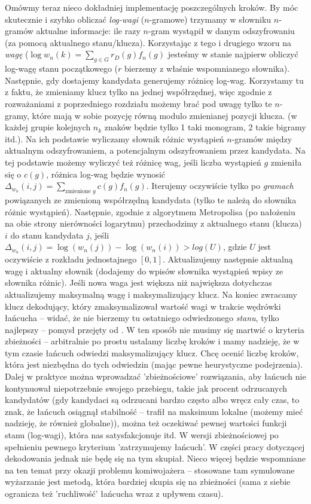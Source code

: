 \documentclass[a4paper]{article}
\theoremstyle{defn}
\theoremstyle{theorem}
\theoremstyle{lemma}
\theoremstyle{cor}
\theoremstyle{fact}
\begin{document}
Omówmy teraz nieco dokładniej implementację poszczególnych kroków. By móc skutecznie i szybko obliczać \textit{log-wagi} ($n$-gramowe) trzymamy w słowniku $n$-gramów aktualne informacje: ile razy $n$-gram wystąpił w danym odszyfrowaniu (za pomocą aktualnego stanu/klucza). Korzystając z tego i drugiego wzoru na \textit{wagę} ($\log w_n(k) =\sum\limits_{g \in G}  {r_D(g)} f_n(g)$ jesteśmy w stanie najpierw obliczyć log-wagę stanu początkowego ($r$ bierzemy z właśnie wspomnianego słownika). Następnie, gdy dostajemy kandydata generujemy różnicę log-wag. Korzystamy tu z faktu, że zmieniamy klucz tylko na jednej współrzędnej, więc zgodnie z rozważaniami z poprzedniego rozdziału możemy brać pod uwagę tylko te $n$-gramy, które mają w sobie pozycję równą modulo zmienianej pozycji klucza. (w każdej grupie kolejnych $n_k$ znaków będzie tylko 1 taki monogram, 2 takie bigramy itd.). Na ich podstawie wyliczamy słownik różnic wystąpień $n$-gramów między aktualnym odszyfrowaniem, a potencjalnym odszyfrowaniem przez kandydata. Na tej podstawie możemy wyliczyć też różnicę wag, jeśli liczba wystąpień $g$ zmieniła się o $c(g)$, różnica log-wag będzie wynosić $\Delta_{w_n}(i,j) = \sum\limits_{\text{zmienione } g}  {c(g)} f_n(g)$. Iterujemy oczywiście tylko po \textit{gramach} powiązanych ze zmienioną współrzędną kandydata (tylko te należą do słownika różnic wystąpień). Następnie, zgodnie z algorytmem Metropolisa (po nałożeniu na obie strony nierówności logarytmu) przechodzimy z aktualnego stanu (klucza) $i$ do stanu kandydata $j$, jeśli $\Delta_{w_n}(i,j) =\log(w_n(j)) - \log(w_n(i)) > log(U)$, gdzie $U$ jest oczywiście z rozkładu jednostajnego $[0,1]$. Aktualizujemy następnie aktualną wagę i aktualny słownik (dodajemy do wpisów słownika wystąpień wpisy ze słownika różnic). Jeśli nowa waga jest większa niż największa dotychczas aktualizujemy maksymalną wagę i maksymalizujący klucz. Na koniec zwracamy klucz dekodujący, który zmaksymalizował wartość wagi w trakcie wędrówki łańcucha – widać, że nie bierzemy tu ostatniego odwiedzonego \textit{stanu}, tylko najlepszy – pomysł przejęty od \cite{Chen&Rosenthal}. W ten sposób nie musimy się martwić o kryteria zbieżności – arbitralnie po prostu ustalamy liczbę kroków i mamy nadzieję, że w tym czasie łańcuch odwiedzi maksymalizujący klucz. Chcę ocenić liczbę kroków, która jest niezbędna do tych odwiedzin (mając pewne heurystyczne podejrzenia). Dalej w praktyce można wprowadzać 'zbieżnościowe' rozwiązania, aby łańcuch nie kontynuował niepotrzebnie swojego przebiegu, takie jak procent odrzucanych kandydatów (gdy kandydaci są odrzucani bardzo często albo wręcz cały czas, to znak, że łańcuch osiągnął stabilność – trafił na maksimum lokalne (możemy mieć nadzieję, że również globalne)), można też oczekiwać pewnej wartości funkcji stanu (log-wagi), która nas satysfakcjonuje itd. W wersji zbieżnościowej po spełnieniu pewnego kryterium 'zatrzymujemy łańcuch'. W części pracy dotyczącej dekodowania jednak nie będę się na tym skupiał. Nieco więcej będzie wspomniane na ten temat przy okazji problemu komiwojażera – stosowane tam symulowane wyżarzanie jest metodą, która bardziej skupia się na zbieżności (sama z siebie ogranicza też 'ruchliwość' łańcucha wraz z upływem czasu).
\end{document}
